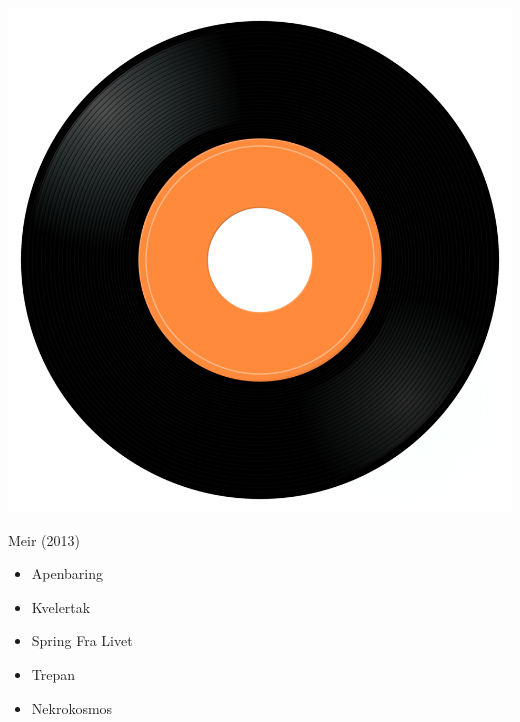 \begin{minipage}[t]{0.25\textwidth}
\captionsetup{type=figure}
\includegraphics[width=\textwidth]{Images/cover.png}
\caption*{Meir (2013)}
\end{minipage}
\begin{minipage}[t]{0.25\textwidth}\vspace{0pt}
\begin{itemize}[nosep,leftmargin=1em,labelwidth=*,align=left]
	\setlength{\itemsep}{0pt}
	\item Apenbaring
	\item Kvelertak
	\item Spring Fra Livet
	\item Trepan
	\item Nekrokosmos
\end{itemize}
\end{minipage}
